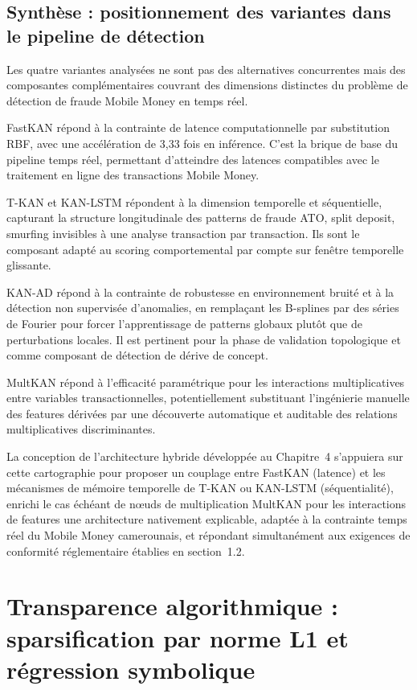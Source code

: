 \documentclass[11pt,a4paper,oneside]{report}
\theoremstyle{definition}
\theoremstyle{remark}
\begin{document}
\subsection{Synthèse : positionnement des variantes dans le pipeline de détection}

Les quatre variantes analysées ne sont pas des alternatives concurrentes mais des composantes complémentaires couvrant des dimensions distinctes du problème de détection de fraude Mobile Money en temps réel.

FastKAN répond à la contrainte de latence computationnelle par substitution RBF, avec une accélération de 3,33 fois en inférence. C'est la brique de base du pipeline temps réel, permettant d'atteindre des latences compatibles avec le traitement en ligne des transactions Mobile Money.

T-KAN et KAN-LSTM répondent à la dimension temporelle et séquentielle, capturant la structure longitudinale des patterns de fraude  ATO, split deposit, smurfing  invisibles à une analyse transaction par transaction. Ils sont le composant adapté au scoring comportemental par compte sur fenêtre temporelle glissante.

KAN-AD répond à la contrainte de robustesse en environnement bruité et à la détection non supervisée d'anomalies, en remplaçant les B-splines par des séries de Fourier pour forcer l'apprentissage de patterns globaux plutôt que de perturbations locales. Il est pertinent pour la phase de validation topologique et comme composant de détection de dérive de concept.

MultKAN répond à l'efficacité paramétrique pour les interactions multiplicatives entre variables transactionnelles, potentiellement substituant l'ingénierie manuelle des features dérivées par une découverte automatique et auditable des relations multiplicatives discriminantes.

La conception de l'architecture hybride développée au Chapitre~4 s'appuiera sur cette cartographie pour proposer un couplage entre FastKAN (latence) et les mécanismes de mémoire temporelle de T-KAN ou KAN-LSTM (séquentialité), enrichi le cas échéant de nœuds de multiplication MultKAN pour les interactions de features  une architecture nativement explicable, adaptée à la contrainte temps réel du Mobile Money camerounais, et répondant simultanément aux exigences de conformité réglementaire établies en section~1.2.

\section{Transparence algorithmique : sparsification par norme L1 et régression symbolique}
\end{document}
